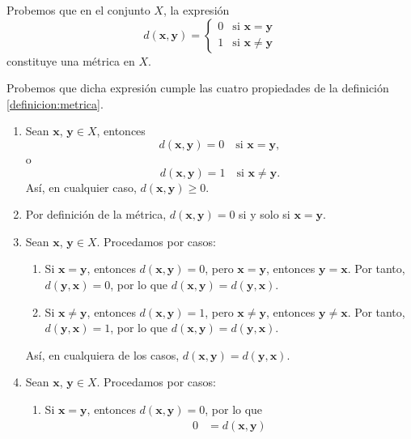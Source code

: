 \begin{examplebox}{}{}
    Probemos que en el conjunto $X$, la expresión
    $$d(\mathbf{x}, \mathbf{y}) = \begin{cases}
        0 & \text{si } \mathbf{x} = \mathbf{y} \\
        1 & \text{si } \mathbf{x} \neq \mathbf{y}
    \end{cases}$$
    constituye una métrica en $X$.

    \tcblower
    \demostracion Probemos que dicha expresión cumple las cuatro propiedades de la definición \ref{definicion:metrica}.
    \begin{enumerate}[label=\roman*), topsep=6pt, itemsep=0pt]
        \item Sean $\mathbf{x}$, $\mathbf{y} \in X$, entonces
        $$d(\mathbf{x}, \mathbf{y}) = 0 \quad \text{si } \mathbf{x} = \mathbf{y},$$
        o
        $$d(\mathbf{x}, \mathbf{y}) = 1 \quad \text{si } \mathbf{x} \neq \mathbf{y}.$$
        Así, en cualquier caso, $d(\mathbf{x}, \mathbf{y}) \geq 0$.
        \item Por definición de la métrica, $d(\mathbf{x}, \mathbf{y}) = 0$ si y solo si $\mathbf{x} = \mathbf{y}$.
        \item Sean $\mathbf{x}$, $\mathbf{y} \in X$. Procedamos por casos:
        \begin{enumerate}
            \item Si $\mathbf{x} = \mathbf{y}$, entonces $d(\mathbf{x}, \mathbf{y}) = 0$, pero $\mathbf{x} = \mathbf{y}$, entonces $\mathbf{y} = \mathbf{x}$. Por tanto, $d(\mathbf{y}, \mathbf{x}) = 0$, por lo que $d(\mathbf{x}, \mathbf{y}) = d(\mathbf{y}, \mathbf{x})$.
            \item Si $\mathbf{x} \neq \mathbf{y}$, entonces $d(\mathbf{x}, \mathbf{y}) = 1$, pero $\mathbf{x} \neq \mathbf{y}$, entonces $\mathbf{y} \neq \mathbf{x}$. Por tanto, $d(\mathbf{y}, \mathbf{x}) = 1$, por lo que $d(\mathbf{x}, \mathbf{y}) = d(\mathbf{y}, \mathbf{x})$.
        \end{enumerate}
        Así, en cualquiera de los casos, $d(\mathbf{x}, \mathbf{y}) = d(\mathbf{y}, \mathbf{x})$.
        \item Sean $\mathbf{x}$, $\mathbf{y} \in X$. Procedamos por casos:
        \begin{enumerate}
            \item Si $\mathbf{x} = \mathbf{y}$, entonces $d(\mathbf{x}, \mathbf{y}) = 0$, por lo que
            \begin{align*}
                0 & = d(\mathbf{x}, \mathbf{y}) \\

\end{align*}
\end{enumerate}
\end{enumerate}
\end{examplebox}
